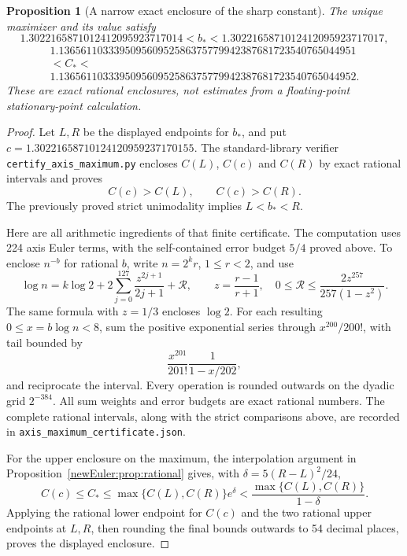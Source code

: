 \documentclass[11pt,letterpaper]{article}
\newtheorem{proposition}[theorem]{Proposition}
\theoremstyle{definition}
\theoremstyle{remark}
\begin{document}
\begin{proposition}[A narrow exact enclosure of the sharp constant]
\label{newEuler:prop:narrow}
The unique maximizer and its value satisfy
\[
 1.3022165871012412095923717014
 <b_*<1.3022165871012412095923717017,
\]
\[
 \begin{gathered}
 1.136561103339509560952586375779942387681723540765044951\\
 <C_*<\\
 1.136561103339509560952586375779942387681723540765044952.
 \end{gathered}
\]
These are exact rational enclosures, not estimates from a
floating-point stationary-point calculation.
\end{proposition}
\begin{proof}
Let $L,R$ be the displayed endpoints for $b_*$, and put
$c=1.30221658710124120959237170155$. The standard-library verifier
\texttt{certify\_axis\_maximum.py} encloses $C(L)$, $C(c)$ and
$C(R)$ by exact rational intervals and proves
\[
 C(c)>C(L),\qquad C(c)>C(R).
\]
The previously proved strict unimodality implies $L<b_*<R$.

Here are all arithmetic ingredients of that finite certificate.
The computation uses 224 axis Euler terms, with the self-contained
error budget $5/4$ proved above. To enclose $n^{-b}$ for rational $b$, write
$n=2^k r$, $1\le r<2$, and use
\[
 \log n=k\log2+2\sum_{j=0}^{127}\frac{z^{2j+1}}{2j+1}
             +\mathcal R,\qquad z=\frac{r-1}{r+1},
 \quad 0\le\mathcal R\le\frac{2z^{257}}{257(1-z^2)}.
\]
The same formula with $z=1/3$ encloses $\log2$. For each resulting
$0\le x=b\log n<8$, sum the positive exponential series through
$x^{200}/200!$, with tail bounded by
\[
 \frac{x^{201}}{201!}\frac1{1-x/202},
\]
and reciprocate the interval. Every operation is rounded outwards
on the dyadic grid $2^{-384}$. All sum weights and error budgets
are exact rational numbers. The complete rational intervals, along
with the strict comparisons above, are recorded in
\texttt{axis\_maximum\_certificate.json}.

For the upper enclosure on the maximum, the interpolation argument
in Proposition~\ref{newEuler:prop:rational} gives, with
$\delta=5(R-L)^2/24$,
\[
 C(c)\le C_*\le\max\{C(L),C(R)\}e^{\delta}
 <\frac{\max\{C(L),C(R)\}}{1-\delta}.
\]
Applying the rational lower endpoint for $C(c)$ and the two rational upper
endpoints at $L,R$, then rounding the final bounds outwards to
54 decimal places, proves the displayed enclosure.
\end{proof}
\end{document}
